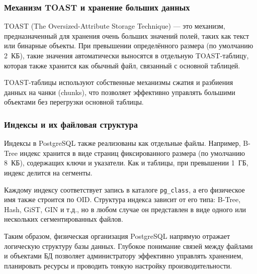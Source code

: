 \subsubsection{Механизм TOAST и хранение больших данных}

TOAST (The Oversized-Attribute Storage Technique) --- это механизм, предназначенный для хранения очень больших значений полей, таких как текст или бинарные объекты. При превышении определённого размера (по умолчанию 2~КБ), такие значения автоматически выносятся в отдельную TOAST-таблицу, которая также хранится как обычный файл, связанный с основной таблицей.

TOAST-таблицы используют собственные механизмы сжатия и разбиения данных на чанки (chunks), что позволяет эффективно управлять большими объектами без перегрузки основной таблицы.

\subsubsection{Индексы и их файловая структура}

Индексы в PostgreSQL также реализованы как отдельные файлы. Например, B-Tree индекс хранится в виде страниц фиксированного размера (по умолчанию 8~КБ), содержащих ключи и указатели. Как и таблицы, при превышении 1~ГБ, индекс делится на сегменты.

Каждому индексу соответствует запись в каталоге \texttt{pg\_class}, а его физическое имя также строится по OID. Структура индекса зависит от его типа: B-Tree, Hash, GiST, GIN и т.д., но в любом случае он представлен в виде одного или нескольких сегментированных файлов.

\bigskip

Таким образом, физическая организация PostgreSQL напрямую отражает логическую структуру базы данных. Глубокое понимание связей между файлами и объектами БД позволяет администратору эффективно управлять хранением, планировать ресурсы и проводить тонкую настройку производительности.


